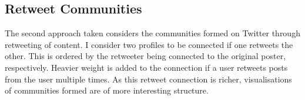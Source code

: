 
\subsection{Retweet Communities}

The second approach taken considers the communities formed on Twitter through retweeting of content. I consider two profiles to be connected if one retweets the other. This is ordered by the retweeter being connected to the original poster, respectively. Heavier weight is added to the connection if a user retweets posts from the user multiple times. As this retweet connection is richer, visualisations of communities formed are of more interesting structure. 


